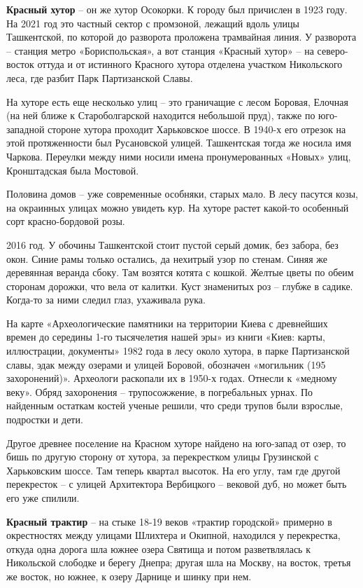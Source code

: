 \textbf{Красный хутор} – он же хутор Осокорки. К городу был причислен в 1923 году. На 2021 год это частный сектор с промзоной, лежащий вдоль улицы Ташкентской, по которой до разворота проложена трамвайная линия. У разворота – станция метро «Бориспольская», а вот станция «Красный хутор» – на северо-восток оттуда и от истинного Красного хутора отделена участком Никольского леса, где разбит Парк Партизанской Славы.

На хуторе есть еще несколько улиц – это граничащие с лесом Боровая, Елочная (на ней ближе к Староболгарской находится небольшой пруд), также по юго-западной стороне хутора проходит Харьковское шоссе. В 1940-х его отрезок на этой протяженности был Русановской улицей. Ташкентская тогда же носила имя Чаркова. Переулки между ними носили имена пронумерованных «Новых» улиц, Кронштадская была Мостовой.

Половина домов – уже современные особняки, старых мало. В лесу пасутся козы, на окраинных улицах можно увидеть кур. На хуторе растет какой-то особенный сорт красно-бордовой розы.

2016 год. У обочины Ташкентской стоит пустой серый домик, без забора, без окон. Синие рамы только остались, да нехитрый узор по стенам. Синяя же деревянная веранда сбоку. Там возятся котята с кошкой. Желтые цветы по обеим сторонам дорожки, что вела от калитки. Куст знаменитых роз – глубже в садике. Когда-то за ними следил глаз, ухаживала рука.

На карте «Археологические памятники на территории Киева с древнейших времен до середины 1-го тысячелетия нашей эры» из книги «Киев: карты, иллюстрации, документы» 1982 года в лесу около хутора, в парке Партизанской славы, эдак между озерами и улицей Боровой, обозначен «могильник (195 захоронений)». Археологи раскопали их в 1950-х годах. Отнесли к «медному веку». Обряд захоронения – трупосожжение, в погребальных урнах. По найденным остаткам костей ученые решили, что среди трупов были взрослые, подростки и дети.

Другое древнее поселение на Красном хуторе найдено на юго-запад от озер, то бишь по другую сторону от хутора, за перекрестком улицы Грузинской с Харьковским шоссе. Там теперь квартал высоток. На его углу, там где другой перекресток – с улицей Архитектора Вербицкого – вековой дуб, но может быть его уже спилили.\\

\medskip


\textbf{Красный трактир} – на стыке 18-19 веков «трактир городской» примерно в окрестностях между улицами Шлихтера и Окипной, находился у перекрестка, откуда одна дорога шла южнее озера Святища и потом разветвлялась к Никольской слободке и берегу Днепра; другая шла на Москву, на восток, третья же восток, но южнее, к озеру Дарнице и шинку при нем.\\ 

